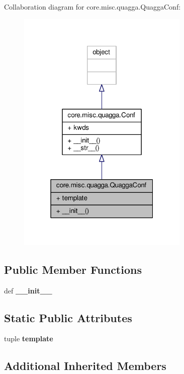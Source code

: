 Collaboration diagram for core.\+misc.\+quagga.\+Quagga\+Conf\+:
\nopagebreak
\begin{figure}[H]
\begin{center}
\leavevmode
\includegraphics[width=232pt]{classcore_1_1misc_1_1quagga_1_1_quagga_conf__coll__graph}
\end{center}
\end{figure}
\subsection*{Public Member Functions}
\begin{DoxyCompactItemize}
\item 
\hypertarget{classcore_1_1misc_1_1quagga_1_1_quagga_conf_abb089e353a6f570c1bce44a3cc7fc3ce}{def {\bfseries \+\_\+\+\_\+init\+\_\+\+\_\+}}\label{classcore_1_1misc_1_1quagga_1_1_quagga_conf_abb089e353a6f570c1bce44a3cc7fc3ce}

\end{DoxyCompactItemize}
\subsection*{Static Public Attributes}
\begin{DoxyCompactItemize}
\item 
tuple {\bfseries template}
\end{DoxyCompactItemize}
\subsection*{Additional Inherited Members}


